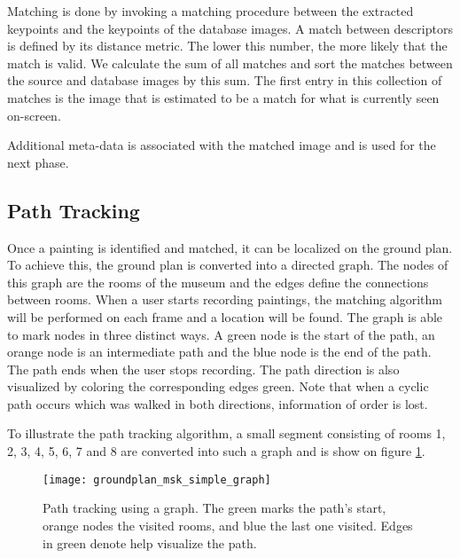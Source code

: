 	Matching is done by invoking a matching procedure between the extracted keypoints and the keypoints of the database images. A match between descriptors is defined by its distance metric. The lower this number, the more likely that the match is valid. We calculate the sum of all matches and sort the matches between the source and database images by this sum. The first entry in this collection of matches is the image that is estimated to be a match for what is currently seen on-screen. 

	Additional meta-data is associated with the matched image and is used for the next phase.

	\subsection{Path Tracking}
	Once a painting is identified and matched, it can be localized on the ground plan. To achieve this, the ground plan is converted into a directed graph. The nodes of this graph are the rooms of the museum and the edges define the connections between rooms. When a user starts recording paintings, the matching algorithm will be performed on each frame and a location will be found. The graph is able to mark nodes in three distinct ways. A green node is the start of the path, an orange node is an intermediate path and the blue node is the end of the path. The path ends when the user stops recording. The path direction is also visualized by coloring the corresponding edges green. Note that when a cyclic path occurs which was walked in both directions, information of order is lost.


	To illustrate the path tracking algorithm,  a small segment consisting of rooms 1, 2, 3, 4, 5, 6, 7 and 8 are converted into such a graph and is show on figure \ref{fig:groundplan_msk_simple_graph}.



	\begin{figure}
		\texttt{[image: groundplan\_msk\_simple\_graph]}
		\caption{Path tracking using a graph. The green marks the path's start, orange nodes the visited rooms, and blue the last one visited. Edges in green denote help visualize the path.}
		\label{fig:groundplan_msk_simple_graph}
	\end{figure}


